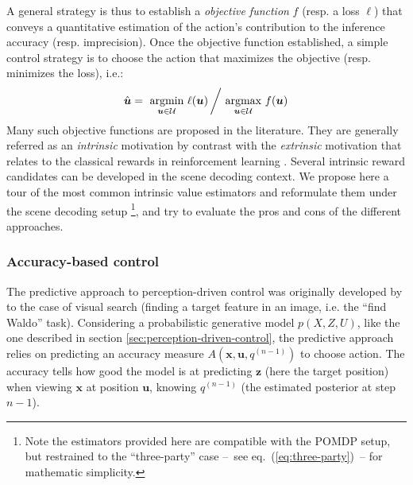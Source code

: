 \documentclass[12pt,twoside,openright]{article}
\begin{document}
A general strategy is thus to establish a \emph{objective function} $f$ (resp. a loss $\ell$) that conveys a quantitative estimation of the action's contribution to the inference accuracy (resp. imprecision). Once the objective function established, a simple control strategy is to choose the action that maximizes the objective (resp. minimizes the loss), i.e.:
\begin{align}
\hat{\boldsymbol{u}} = \underset{\boldsymbol{u}\in\mathcal{U}}{\text{ argmin }}  \ell(\boldsymbol{u})\left/ \underset{\boldsymbol{u}\in\mathcal{U}}{\text{ argmax }}  f(\boldsymbol{u})\right.
\end{align}
Many such objective functions are proposed in the literature. They are generally referred as an \emph{intrinsic} motivation \cite{oudeyer2008can} by contrast with the \emph{extrinsic} motivation that relates to the classical rewards in reinforcement learning \cite{sutton1998reinforcement}. Several intrinsic reward candidates can be developed in the scene decoding context.
We propose here a tour of the most common intrinsic value estimators and reformulate them under the scene decoding setup \footnote{Note the estimators provided here are compatible with the POMDP setup, but restrained to the ``three-party'' case --~see eq.~(\ref{eq:three-party})~-- for mathematic simplicity.}, and try to evaluate the pros and cons of the different approaches.


\subsubsection{Accuracy-based control}\label{sec:infomax}


The predictive approach to perception-driven control was originally developed by \cite{najemnik2005optimal} to the case of visual search (finding a target feature in an image, i.e. the ``find Waldo'' task).
Considering a  probabilistic generative model $p(X,Z,U)$, like the one described in section \ref{sec:perception-driven-control}, the predictive approach relies on predicting an accuracy measure $A(\boldsymbol{x}, \boldsymbol{u}, q^{(n-1)})$ to choose action. 
The accuracy tells how good the model is at predicting $\boldsymbol{z}$ (here the target position) when viewing $\boldsymbol{x}$ at position $\boldsymbol{u}$,
knowing $q^{(n-1)}$ (the estimated posterior at step $n-1$).
\end{document}

